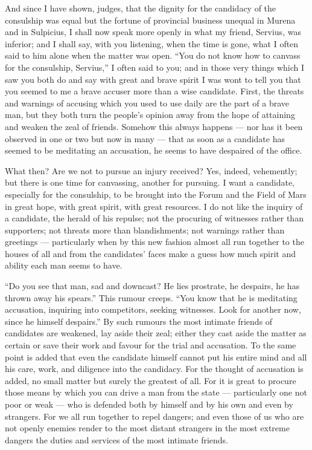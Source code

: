  And since I have shown, judges, that the dignity for the candidacy of the consulship was equal but the fortune of provincial business unequal in Murena and in Sulpicius, I shall now speak more openly in what my friend, Servius, was inferior; and I shall say, with you listening, when the time is gone, what I often said to him alone when the matter was open. ``You do not know how to canvass for the consulship, Servius,'' I often said to you; and in those very things which I saw you both do and say with great and brave spirit I was wont to tell you that you seemed to me a brave accuser more than a wise candidate. First, the threats and warnings of accusing which you used to use daily are the part of a brave man, but they both turn the people's opinion away from the hope of attaining and weaken the zeal of friends. Somehow this always happens --- nor has it been observed in one or two but now in many --- that as soon as a candidate has seemed to be meditating an accusation, he seems to have despaired of the office.

 What then? Are we not to pursue an injury received? Yes, indeed, vehemently; but there is one time for canvassing, another for pursuing. I want a candidate, especially for the consulship, to be brought into the Forum and the Field of Mars in great hope, with great spirit, with great resources. I do not like the inquiry of a candidate, the herald of his repulse; not the procuring of witnesses rather than supporters; not threats more than blandishments; not warnings rather than greetings --- particularly when by this new fashion almost all run together to the houses of all and from the candidates' faces make a guess how much spirit and ability each man seems to have.

 ``Do you see that man, sad and downcast? He lies prostrate, he despairs, he has thrown away his spears.'' This rumour creeps. ``You know that he is meditating accusation, inquiring into competitors, seeking witnesses. Look for another now, since he himself despairs.'' By such rumours the most intimate friends of candidates are weakened, lay aside their zeal; either they cast aside the matter as certain or save their work and favour for the trial and accusation. To the same point is added that even the candidate himself cannot put his entire mind and all his care, work, and diligence into the candidacy. For the thought of accusation is added, no small matter but surely the greatest of all. For it is great to procure those means by which you can drive a man from the state --- particularly one not poor or weak --- who is defended both by himself and by his own and even by strangers. For we all run together to repel dangers; and even those of us who are not openly enemies render to the most distant strangers in the most extreme dangers the duties and services of the most intimate friends.

